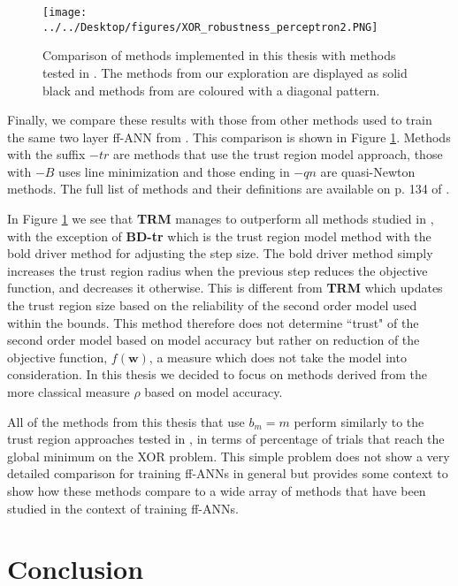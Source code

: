 \documentclass[letterpaper,12pt,titlepage,oneside,final]{book}
\begin{document}
	
	\begin{figure}[h]
		\centering
		\texttt{[image: ../../Desktop/figures/XOR\_robustness\_perceptron2.PNG]}
		\caption{Comparison of methods implemented in this thesis with methods tested in \cite{Shepherd.1997}. The methods from our exploration are displayed as solid black and methods from \cite{Shepherd.1997} are coloured with a diagonal pattern.}
		\label{figure:XOR_comparison}
	\end{figure}
	Finally, we compare these results with those from other methods used to train the same two layer ff-ANN from \cite{Shepherd.1997}. This comparison is shown in Figure \ref{figure:XOR_comparison}. Methods with the suffix $-tr$ are methods that use the trust region model approach, those with $-B$ uses line minimization and those ending in $-qn$ are quasi-Newton methods. The full list of methods and their definitions are available on p. 134 of \cite{Shepherd.1997}.
	
	In Figure \ref{figure:XOR_comparison} we see that \textbf{TRM} manages to outperform all methods studied in \cite{Shepherd.1997}, with the exception of \textbf{BD-tr} which is the trust region model method with the bold driver method for adjusting the step size. The bold driver method simply increases the trust region radius when the previous step reduces the objective function, and decreases it otherwise. This is different from \textbf{TRM} which updates the trust region size based on the reliability of the second order model used within the bounds. This method therefore does not determine ``trust" of the second order model based on model accuracy but rather on reduction of the objective function, $f(\mathbf{w})$, a measure which does not take the model into consideration. In this thesis we decided to focus on methods derived from the more classical measure $\rho$ based on model accuracy. 
	
	All of the methods from this thesis that use $b_{m} = m$ perform similarly to the trust region approaches tested in \cite{Shepherd.1997}, in terms of percentage of trials that reach the global minimum on the XOR problem. This simple problem does not show a very detailed comparison for training ff-ANNs in general but provides some context to show how these methods compare to a wide array of methods that have been studied in the context of training ff-ANNs. 
	
	\chapter{Conclusion}
	
\end{document}

